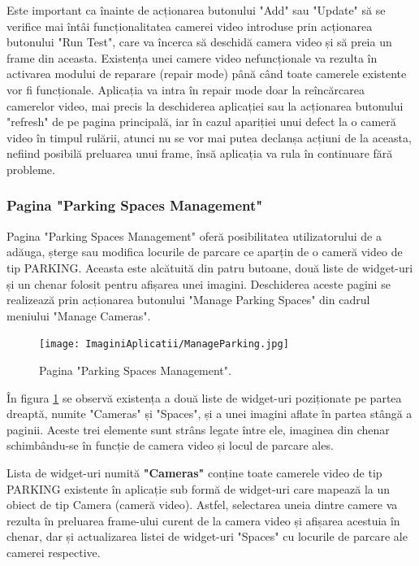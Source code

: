 \documentclass[12pt]{article}
\begin{document}
Este important ca \^{i}nainte de acționarea butonului "Add" sau "Update" s\u{a} se verifice mai \^{i}nt\^{a}i funcționalitatea camerei video introduse prin acționarea butonului "Run Test", care va \^{i}ncerca s\u{a} deschid\u{a} camera video și s\u{a} preia un frame din aceasta. Existența unei camere video nefuncționale va rezulta \^{i}n activarea modului de reparare (repair mode) p\^{a}n\u{a} c\^{a}nd toate camerele existente vor fi funcționale. Aplicația va intra \^{i}n repair mode doar la re\^{i}nc\u{a}rcarea camerelor video, mai precis la deschiderea aplicației sau la acționarea butonului "refresh" de pe pagina principal\u{a}, iar \^{i}n cazul apariției unui defect la o camer\u{a} video \^{i}n timpul rul\u{a}rii, atunci nu se vor mai putea declanșa acțiuni de la aceasta, nefiind posibil\u{a} preluarea unui frame, \^{i}ns\u{a} aplicația va rula \^{i}n continuare f\u{a}r\u{a} probleme.

\subsubsection{Pagina "Parking Spaces Management"}

Pagina "Parking Spaces Management" ofer\u{a} posibilitatea utilizatorului de a ad\u{a}uga, șterge sau modifica locurile de parcare ce aparțin de o camer\u{a} video de tip PARKING. Aceasta este alc\u{a}tuit\u{a} din patru butoane, dou\u{a} liste de widget-uri și un chenar folosit pentru afișarea unei imagini. Deschiderea aceste pagini se realizeaz\u{a} prin acționarea butonului "Manage Parking Spaces" din cadrul meniului "Manage Cameras".

\begin{figure}[H]
  \centering
  \texttt{[image: ImaginiAplicatii/ManageParking.jpg]}
  \caption{Pagina "Parking Spaces Management".}
  \label{fig:aplicatie_pagina_parking_spaces_management}
\end{figure}

\^{I}n figura \ref{fig:aplicatie_pagina_parking_spaces_management} se observ\u{a} existența a dou\u{a} liste de widget-uri poziționate pe partea dreapt\u{a}, numite "Cameras" și "Spaces", și a unei imagini aflate \^{i}n partea st\^{a}ng\u{a} a paginii. Aceste trei elemente sunt str\^{a}ns legate \^{i}ntre ele, imaginea din chenar schimb\^{a}ndu-se \^{i}n funcție de camera video și locul de parcare ales.

Lista de widget-uri numit\u{a} \textbf{"Cameras"} conține toate camerele video de tip PARKING existente \^{i}n aplicație sub form\u{a} de widget-uri care mapeaz\u{a} la un obiect de tip Camera (camer\u{a} video). Astfel, selectarea uneia dintre camere va rezulta \^{i}n preluarea frame-ului curent de la camera video și afișarea acestuia \^{i}n chenar, dar și actualizarea listei de widget-uri "Spaces" cu locurile de parcare ale camerei respective.
\end{document}
